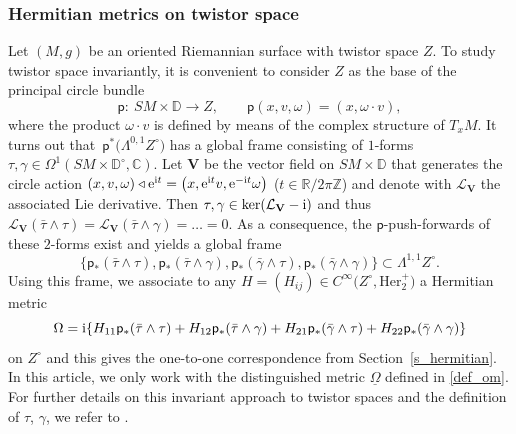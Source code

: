 \documentclass[pdftex]{sigma}
\numberwithin{equation}{section}
\theoremstyle{definition}
\newcommand{\Z}{\mathbb{Z}} %
\newcommand{\R}{\mathbb{R}} %
\newcommand{\C}{\mathbb{C}} %
\newcommand{\DD}{\mathbb{D}} %
\newcommand{\1}{{\bf 1}}
\newcommand{\Om}{{\underline{\Omega}}}
\newcommand{\act}{\triangleleft}
\begin{document}
\subsubsection{Hermitian metrics on twistor space}
Let $(M,g)$ be an oriented Riemannian surface with twistor space $Z$. To study twistor space invariantly, it is convenient to consider $Z$ as the base of the principal circle bundle
\[
	\mathsf{p}\colon\ SM\times \DD\rightarrow Z,\qquad \mathsf{p}(x,v,\omega)=(x,\omega\cdot v),
\]
where the product $\omega\cdot v$ is defined by means of the complex structure of $T_x M$.
It turns out that~$\mathsf{p}^* \bigl(\Lambda^{0,1}Z^\circ\bigr)$ has a global frame consisting of
$1$-forms
$
\tau,\gamma \in \Omega^1(SM\times \DD^\circ,\C)$.
Let $\mathbf V$ be the vector field on $SM\times \DD$ that generates the circle action $(x,v,\omega)\act {\rm e}^{{\rm i}t}=\bigl(x,{\rm e}^{{\rm i}t}v,{\rm e}^{-{\rm i}t}\omega\bigr)$ ($t\in \R/2\pi \Z$) and denote with $\mathcal L_{\mathbf V}$ the associated Lie derivative. Then $\tau,\gamma \in \ker (\mathcal L_\mathbf{V} - {\rm i})$ and thus $\mathcal L_{\mathbf V}(\bar \tau\wedge \tau)=\mathcal L_{\mathbf V}(\bar \tau\wedge \gamma)=\dots = 0$. As a consequence, the $\mathsf{p}$-push-forwards of these $2$-forms exist and yields a global frame
\[
	\{ \mathsf{p}_*(\bar \tau\wedge \tau),\mathsf{p}_*(\bar \tau\wedge \gamma),\mathsf{p}_*(\bar \gamma\wedge \tau),\mathsf{p}_*(\bar \gamma\wedge \gamma)\}\subset \Lambda^{1,1}Z^\circ.
\]
Using this frame, we associate to any $H=(H_{ij})\in C^\infty\bigl(Z^\circ,\mathrm{Her}_2^+\bigr)$ a Hermitian metric
\[
	 \Omega={\rm i}\{H_{11} \mathsf{p}_*(\bar \tau\wedge \tau)+ H_{12} \mathsf{p}_*(\bar \tau\wedge \gamma)+H_{21} \mathsf{p}_*(\bar \gamma\wedge \tau)+H_{22} \mathsf{p}_*(\bar \gamma\wedge \gamma) \}
\]
on $Z^\circ$ and this gives the one-to-one correspondence from Section~\ref{s_hermitian}. In this article, we only work with the distinguished metric $\Om$ defined in \eqref{def_om}.
For further details on this invariant approach to twistor spaces and the definition of $\tau$, $\gamma$, we refer to \cite{BLP24,BoPa23}.
\end{document}
